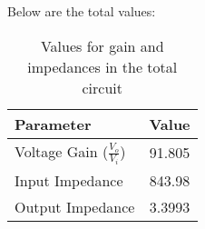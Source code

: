 Below are the total values:

\begin{table}[h]
    \centering
    \begin{tabular}{|l|c|}
    \hline
    {\bf Parameter} & {\bf Value} \\ \hline \hline
    Voltage Gain ($\frac{V_{o}}{V_{i}}$)  & 91.805 \\ \hline
    Input Impedance & 843.98 \\ \hline
    Output Impedance  & 3.3993 \\ \hline
    \end{tabular}
    \caption{Values for gain and impedances in the total circuit}
    \label{tab:values}
\end{table}


  





